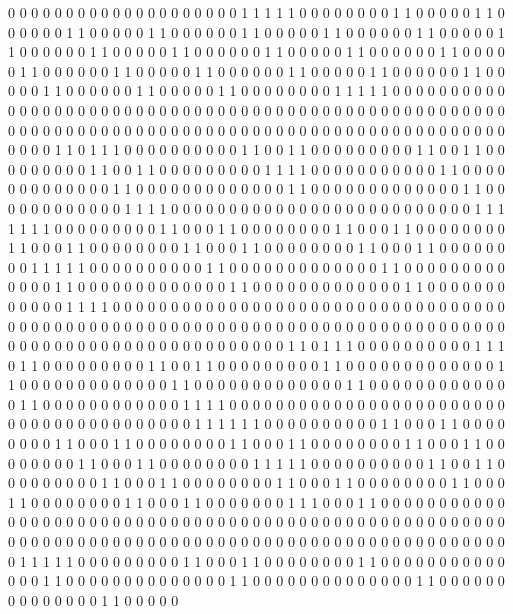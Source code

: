 0 0 0 0 0 0 0 0 0 0 0 0 0 0 0
0 0 0 0 0 1 1 1 1 1 0 0 0 0 0
0 0 0 1 1 0 0 0 0 0 1 1 0 0 0
0 0 0 1 1 0 0 0 0 0 1 1 0 0 0
0 0 0 1 1 0 0 0 0 0 1 1 0 0 0
0 0 0 1 1 0 0 0 0 0 1 1 0 0 0
0 0 0 1 1 0 0 0 0 0 1 1 0 0 0
0 0 0 1 1 0 0 0 0 0 1 1 0 0 0
0 0 0 1 1 0 0 0 0 0 1 1 0 0 0
0 0 0 1 1 0 0 0 0 0 1 1 0 0 0
0 0 0 1 1 0 0 0 0 0 1 1 0 0 0
0 0 0 1 1 0 0 0 0 0 1 1 0 0 0
0 0 0 1 1 0 0 0 0 0 1 1 0 0 0
0 0 0 0 0 1 1 1 1 1 0 0 0 0 0
0 0 0 0 0 0 0 0 0 0 0 0 0 0 0
0 0 0 0 0 0 0 0 0 0 0 0 0 0 0
0 0 0 0 0 0 0 0 0 0 0 0 0 0 0
0 0 0 0 0 0 0 0 0 0 0 0 0 0 0
0 0 0 0 0 0 0 0 0 0 0 0 0 0 0
0 0 0 0 0 0 0 0 0 0 0 0 0 0 0
0 0 0 0 0 1 1 0 1 1 1 0 0 0 0
0 0 0 0 0 0 1 1 0 0 1 1 0 0 0
0 0 0 0 0 0 1 1 0 0 1 1 0 0 0
0 0 0 0 0 0 1 1 0 0 1 1 0 0 0
0 0 0 0 0 0 1 1 1 1 0 0 0 0 0
0 0 0 0 0 0 1 1 0 0 0 0 0 0 0
0 0 0 0 0 0 1 1 0 0 0 0 0 0 0
0 0 0 0 0 0 1 1 0 0 0 0 0 0 0
0 0 0 0 0 0 1 1 0 0 0 0 0 0 0
0 0 0 0 0 1 1 1 1 0 0 0 0 0 0
0 0 0 0 0 0 0 0 0 0 0 0 0 0 0
0 0 0 0 0 1 1 1 1 1 1 1 0 0 0
0 0 0 0 0 0 1 1 0 0 0 1 1 0 0
0 0 0 0 0 0 1 1 0 0 0 1 1 0 0
0 0 0 0 0 0 1 1 0 0 0 1 1 0 0
0 0 0 0 0 0 1 1 0 0 0 1 1 0 0
0 0 0 0 0 0 1 1 0 0 0 1 1 0 0
0 0 0 0 0 0 1 1 1 1 1 0 0 0 0
0 0 0 0 0 0 1 1 0 0 0 0 0 0 0
0 0 0 0 0 0 1 1 0 0 0 0 0 0 0
0 0 0 0 0 0 1 1 0 0 0 0 0 0 0
0 0 0 0 0 0 1 1 0 0 0 0 0 0 0
0 0 0 0 0 0 1 1 0 0 0 0 0 0 0
0 0 0 0 0 1 1 1 1 0 0 0 0 0 0
0 0 0 0 0 0 0 0 0 0 0 0 0 0 0
0 0 0 0 0 0 0 0 0 0 0 0 0 0 0
0 0 0 0 0 0 0 0 0 0 0 0 0 0 0
0 0 0 0 0 0 0 0 0 0 0 0 0 0 0
0 0 0 0 0 0 0 0 0 0 0 0 0 0 0
0 0 0 0 0 0 0 0 0 0 0 0 0 0 0
0 0 0 0 0 1 1 0 1 1 1 0 0 0 0
0 0 0 0 0 0 1 1 1 0 1 1 0 0 0
0 0 0 0 0 0 1 1 0 0 1 1 0 0 0
0 0 0 0 0 0 1 1 0 0 0 0 0 0 0
0 0 0 0 0 0 1 1 0 0 0 0 0 0 0
0 0 0 0 0 0 1 1 0 0 0 0 0 0 0
0 0 0 0 0 0 1 1 0 0 0 0 0 0 0
0 0 0 0 0 0 1 1 0 0 0 0 0 0 0
0 0 0 0 0 1 1 1 1 0 0 0 0 0 0
0 0 0 0 0 0 0 0 0 0 0 0 0 0 0
0 0 0 0 0 0 0 0 0 0 0 0 0 0 0
0 0 0 0 1 1 1 1 1 1 0 0 0 0 0
0 0 0 0 0 1 1 0 0 0 1 1 0 0 0
0 0 0 0 0 1 1 0 0 0 1 1 0 0 0
0 0 0 0 0 1 1 0 0 0 1 1 0 0 0
0 0 0 0 0 1 1 0 0 0 1 1 0 0 0
0 0 0 0 0 1 1 0 0 0 1 1 0 0 0
0 0 0 0 0 1 1 1 1 1 0 0 0 0 0
0 0 0 0 0 1 1 0 0 1 1 0 0 0 0
0 0 0 0 0 1 1 0 0 0 1 1 0 0 0
0 0 0 0 0 1 1 0 0 0 1 1 0 0 0
0 0 0 0 0 1 1 0 0 0 1 1 0 0 0
0 0 0 0 0 1 1 0 0 0 1 1 0 0 0
0 0 0 0 1 1 1 0 0 0 1 1 0 0 0
0 0 0 0 0 0 0 0 0 0 0 0 0 0 0
0 0 0 0 0 0 0 0 0 0 0 0 0 0 0
0 0 0 0 0 0 0 0 0 0 0 0 0 0 0
0 0 0 0 0 0 0 0 0 0 0 0 0 0 0
0 0 0 0 0 0 0 0 0 0 0 0 0 0 0
0 0 0 0 0 0 0 0 0 0 0 0 0 0 0
0 0 0 0 0 1 1 1 1 1 0 0 0 0 0
0 0 0 0 1 1 0 0 0 1 1 0 0 0 0
0 0 0 0 1 1 0 0 0 0 0 0 0 0 0
0 0 0 0 0 1 1 0 0 0 0 0 0 0 0
0 0 0 0 0 0 1 1 0 0 0 0 0 0 0
0 0 0 0 0 0 0 1 1 0 0 0 0 0 0
0 0 0 0 0 0 0 0 1 1 0 0 0 0 0
